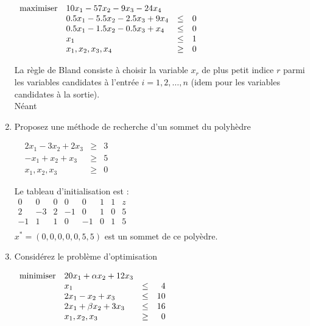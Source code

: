 \begin{enumerate}
    $
    \begin{array}{llcr}
      \mbox{maximiser} & 10 x_1-57 x_2-9x_3-24x_4\\
      & 0.5x_1-5.5x_2-2.5x_3+9x_4 & \leq & 0\\
      & 0.5x_1-1.5x_2-0.5x_3+x_4 & \leq & 0\\
      & x_1 & \leq &1\\
      & x_1, x_2, x_3, x_4 & \geq & 0
    \end{array}
    $


    \begin{solution}
      La règle de Bland consiste à choisir la variable $x_{r}$ de plus petit indice $r$ parmi les variables candidates à l'entrée $i = 1,2, \dots, n$ (idem pour les variables candidates à la sortie). \\
      \newline
      Néant
    \end{solution}

  \item Proposez une méthode de recherche d'un sommet du polyhèdre

    $
    \begin{array}{lrcr}
      & 2x_1-3x_2 +2x_3 & \geq & 3\\
      & -x_1+x_2 +x_3 & \geq & 5\\
      & x_1, x_2, x_3 & \geq & 0
    \end{array}
    $

    \begin{solution}
       Le tableau d'initialisation est : \\
       \newline
      $\begin{array}
      {ccccccc|l}
      0&0&0&0&0&1&1&z  \\ \hline
      2&-3&2&-1&0&1&0&5 \\
      -1&1&1&0&-1&0&1&5
      \\\end{array}$\\
      \newline
      \newline
      $x^{*} = (0,0,0,0,0,5,5)$ est un sommet de ce polyèdre.
    \end{solution}

  \item  Considérez le problème d'optimisation

    $
    \begin{array}{llcr}
      \mbox{minimiser} & 20 x_1+\alpha x_2+12 x_3\\
      & x_1  & \leq & 4\\
      &2x_1 - x_2+x_3 & \leq & 10\\
      &2x_1+\beta x_2+ 3x_3 & \leq & 16\\
      & x_1, x_2, x_3 & \geq & 0
    \end{array}
    $



\end{enumerate}
